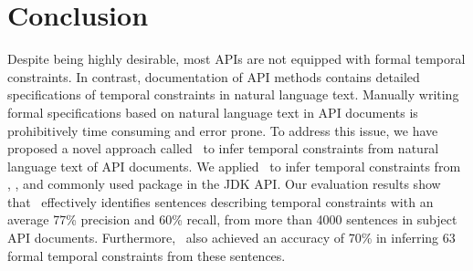 \section{Conclusion}
\label{sec:conclusion}

Despite being highly desirable, most APIs are not equipped with formal temporal constraints.
In contrast, documentation of API methods contains detailed specifications of temporal constraints in natural language text.
Manually writing formal specifications based on natural language text in API documents is prohibitively time consuming and error prone.
To address this issue, we have proposed a novel approach called \tool\ to infer temporal constraints from natural language text of API documents.
We applied \tool\ to infer temporal constraints from
\paypalAPI, \amazonAPI, and  
commonly used package  in the JDK API.
Our evaluation results show that \tool\ effectively identifies sentences describing
temporal constraints with an average 77\% precision and 60\% recall,
from more than 4000 sentences in subject API documents.
Furthermore, \tool\ also achieved an accuracy of
70\% in inferring 63 formal temporal constraints from these sentences.